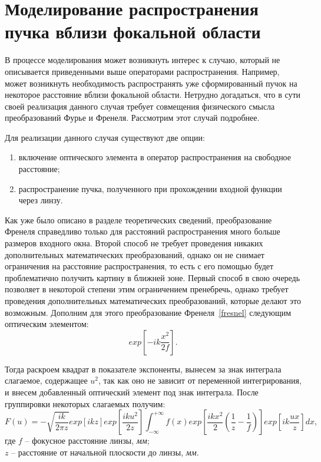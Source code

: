     \section[Моделирование распространения пучка вблизи фокальной области]{\nohyphens{Моделирование распространения пучка вблизи фокальной области}}{
    \vspace{-0.2cm}

    В процессе моделирования может возникнуть интерес к случаю,
    который не описывается приведенными выше операторами распространения.
    Например, может возникнуть необходимость распространять уже сформированный пучок на некоторое расстояние вблизи фокальной области.
    Нетрудно догадаться, что в сути своей реализация данного случая требует
    совмещения физического смысла преобразований Фурье и Френеля.
    Рассмотрим этот случай подробнее.

    Для реализации данного случая существуют две опции:
    \begin{enumerate}[\arabic*)]
        \item включение оптического элемента в оператор распространения на свободное расстояние;
        \item распространение пучка, полученного при прохождении входной функции через линзу.
    \end{enumerate}
    \vspace{0.2cm}
    Как уже было описано в разделе теоретических сведений,
    преобразование Френеля справедливо только для расстояний распространения много
    больше размеров входного окна. Второй способ не требует проведения никаких
    дополнительных математических преобразований, однако он не снимает ограничения на расстояние распространения,
    то есть с его помощью будет проблематично получить картину в ближней зоне.
    Первый способ в свою очередь позволяет в некоторой степени этим ограничением пренебречь,
    однако требует проведения дополнительных математических преобразований,
    которые делают это возможным. Дополним для этого преобразование Френеля~\eqref{fresnel} следующим оптическим элементом:
    \begin{equation*}
        exp[-ik \frac{x^2}{2f} ].
    \end{equation*}

    Тогда раскроем квадрат в показателе экспоненты, вынесем за знак интеграла слагаемое, содержащее $u^2$,
    так как оно не зависит от переменной интегрирования,
    и внесем добавленный оптический элемент под знак интеграла.
    После группировки некоторых слагаемых получим:
    \begin{equation*}
        F(u) = - \sqrt{\frac{ik}{2 \pi z}}exp[ikz] exp[{ \frac{iku^2}{2z} }] \int_{-\infty}^{+\infty}f(x) exp[\frac{ikx^2}{2}( \frac{1}{z} - \frac{1}{f})] exp[{ik \frac{ux}{z}}]dx,
    \end{equation*}
    \tab где $f$ -- фокусное расстояние линзы, \textit{мм};\\
    \tab \tab \hspace{-0.4cm}$z$ -- расстояние от начальной плоскости до линзы, \textit{мм}.


}
